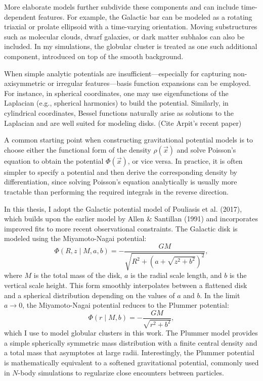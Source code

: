         More elaborate models further subdivide these components and can include time-dependent features. For example, the Galactic bar can be modeled as a rotating triaxial or prolate ellipsoid with a time-varying orientation. Moving substructures such as molecular clouds, dwarf galaxies, or dark matter subhalos can also be included. In my simulations, the globular cluster is treated as one such additional component, introduced on top of the smooth background.

        When simple analytic potentials are insufficient—especially for capturing non-axisymmetric or irregular features—basis function expansions can be employed. For instance, in spherical coordinates, one may use eigenfunctions of the Laplacian (e.g., spherical harmonics) to build the potential. Similarly, in cylindrical coordinates, Bessel functions naturally arise as solutions to the Laplacian and are well suited for modeling disks. (Cite Arpit's recent paper)

        A common starting point when constructing gravitational potential models is to choose either the functional form of the density $\rho(\vec{x})$ and solve Poisson's equation to obtain the potential $\Phi(\vec{x})$, or vice versa. In practice, it is often simpler to specify a potential and then derive the corresponding density by differentiation, since solving Poisson's equation analytically is usually more tractable than performing the required integrals in the reverse direction.

        In this thesis, I adopt the Galactic potential model of Pouliasis et al. (2017), which builds upon the earlier model by Allen \& Santillan (1991) and incorporates improved fits to more recent observational constraints. The Galactic disk is modeled using the Miyamoto-Nagai potential:
        \begin{equation}
            \Phi(R, z \mid M, a, b) = -\frac{G M}{\sqrt{R^2 + \left(a + \sqrt{z^2 + b^2}\right)^2}},
        \end{equation}
        where $M$ is the total mass of the disk, $a$ is the radial scale length, and $b$ is the vertical scale height. This form smoothly interpolates between a flattened disk and a spherical distribution depending on the values of $a$ and $b$. In the limit $a \to 0$, the Miyamoto-Nagai potential reduces to the Plummer potential:
        \begin{equation}
            \Phi(r \mid M, b) = -\frac{G M}{\sqrt{r^2 + b^2}},
        \end{equation}
        which I use to model globular clusters in this work. The Plummer model provides a simple spherically symmetric mass distribution with a finite central density and a total mass that asymptotes at large radii. Interestingly, the Plummer potential is mathematically equivalent to a softened gravitational potential, commonly used in $N$-body simulations to regularize close encounters between particles.

